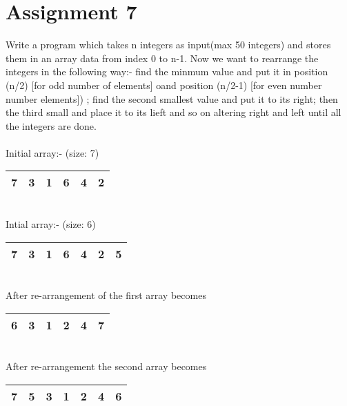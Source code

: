 \section*{\centering Assignment 7}
\vspace{15px}
Write a program which takes n integers as input(max 50 integers)
and stores them in an array data from index 0 to n-1. Now we want to 
rearrange the integers in the following way:- find the minmum
value and put it in position (n/2) [for odd number of elements]
oand position (n/2-1) [for even number number elements]) ;
find the second smallest value and put it to its right;
then the third small and place it to its lieft and so 
on altering right and left until all the integers are done.\\\\
Initial array:- (size: 7)\\
\begin{tabular}{| c | c | c | c | c | c |}
	\hline
	7 & 3 & 1 & 6 & 4 & 2 \\
	\hline
\end{tabular}\\
Intial array:- (size: 6)\\
\begin{tabular}{| c | c | c | c | c | c | c |}
	\hline
	7 & 3 & 1 & 6 & 4 & 2 & 5 \\
	\hline
\end{tabular}\\
After re-arrangement of the first array becomes\\
\begin{tabular}{| c | c | c | c | c | c |}
	\hline
	6 & 3 & 1 & 2 & 4 & 7 \\
	\hline
\end{tabular}\\
After re-arrangement the second array becomes\\
\begin{tabular}{| c | c | c | c | c | c | c |}
	\hline
	7 & 5 & 3 & 1 & 2 & 4 & 6 \\
	\hline
\end{tabular}

